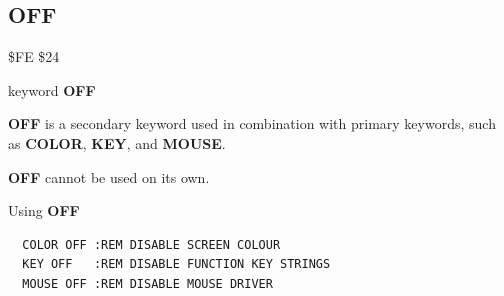 
\newpage
\subsection{OFF}
\begin{description}[leftmargin=2cm,style=nextline]
\item [Token:] \$FE \$24
\item [Format:] keyword {\bf OFF}
\item [Usage:]  {\bf OFF} is a secondary keyword used in
                combination with primary keywords, such as
                {\bf COLOR}, {\bf KEY}, and  {\bf MOUSE}.

\item [Remarks:] {\bf OFF} cannot be used on its own.

\item [Examples:] Using {\bf OFF}

\begin{tcolorbox}[colback=black,coltext=white]
\verbatimfont{\codefont}
\begin{verbatim}
  COLOR OFF :REM DISABLE SCREEN COLOUR
  KEY OFF   :REM DISABLE FUNCTION KEY STRINGS
  MOUSE OFF :REM DISABLE MOUSE DRIVER
\end{verbatim}
\end{tcolorbox}
\end{description}


\newpage
